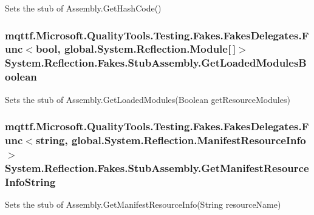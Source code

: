 Sets the stub of Assembly.\-Get\-Hash\-Code()

\hypertarget{class_system_1_1_reflection_1_1_fakes_1_1_stub_assembly_ae6dc4182baa6ef5b2906934121d2f5b9}{
\subsubsection[{Get\-Loaded\-Modules\-Boolean}]{\setlength{\rightskip}{0pt plus 5cm}mqttf.\-Microsoft.\-Quality\-Tools.\-Testing.\-Fakes.\-Fakes\-Delegates.\-Func$<$bool, global.\-System.\-Reflection.\-Module\mbox{[}$\,$\mbox{]}$>$ System.\-Reflection.\-Fakes.\-Stub\-Assembly.\-Get\-Loaded\-Modules\-Boolean}}\label{class_system_1_1_reflection_1_1_fakes_1_1_stub_assembly_ae6dc4182baa6ef5b2906934121d2f5b9}


Sets the stub of Assembly.\-Get\-Loaded\-Modules(\-Boolean get\-Resource\-Modules)

\hypertarget{class_system_1_1_reflection_1_1_fakes_1_1_stub_assembly_a036ff08f73e072de61998036414d1805}{
\subsubsection[{Get\-Manifest\-Resource\-Info\-String}]{\setlength{\rightskip}{0pt plus 5cm}mqttf.\-Microsoft.\-Quality\-Tools.\-Testing.\-Fakes.\-Fakes\-Delegates.\-Func$<$string, global.\-System.\-Reflection.\-Manifest\-Resource\-Info$>$ System.\-Reflection.\-Fakes.\-Stub\-Assembly.\-Get\-Manifest\-Resource\-Info\-String}}\label{class_system_1_1_reflection_1_1_fakes_1_1_stub_assembly_a036ff08f73e072de61998036414d1805}


Sets the stub of Assembly.\-Get\-Manifest\-Resource\-Info(\-String resource\-Name)

